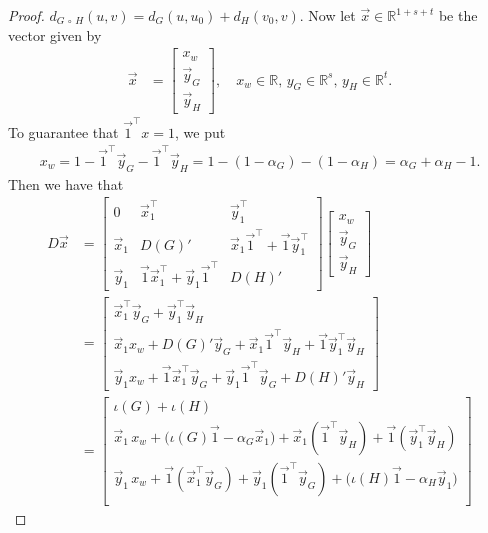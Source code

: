 \documentclass[11pt,a4paper]{article}
\newcommand{\distmatrix}{D}
\newcommand{\x}{\vec{x}}
\newcommand{\y}{\vec{y}}
\newcommand{\one}{\vec{1}}
\newcommand{\Circ}{\circ}
\begin{document}
\begin{proof}
        $d_{G\,\Circ\,H}(u, v)=d_G(u,u_{0})+d_H(v_{0},v)$. Now let $\x\in\mathbb{R}^{1+s+t}$ be the vector given by
            \begin{align}\label{eq:xw}
                \x &= \begin{bmatrix}
                    x_w\\ \y_G \\ \y_H
                \end{bmatrix}, \quad x_w\in\mathbb{R},\, y_G\in\mathbb{R}^{s},\,y_H\in\mathbb{R}^{t}.
            \end{align}
        To guarantee that $\one^\top x = 1$, we put
            \begin{align*}
                x_w = 1-\one^\top \y_G - \one^\top \y_H = 1 - (1-\alpha_G) - (1-\alpha_H) = \alpha_G + \alpha_H - 1.
            \end{align*}
        Then we have that
            \begin{align*}
                \distmatrix \x &= \begin{bmatrix}
                    0 & \x_{1}^\top & \y_{1}^\top\\
                    \x_{1} & {\distmatrix(G)}' & \x_{1}\one^\top + \one \y_{1}^\top\\
                    \y_{1} & \one \x_{1}^\top + \y_{1}\one^\top & {\distmatrix(H)}'
                \end{bmatrix}\begin{bmatrix}
                    x_w\\ \y_G \\ \y_H
                \end{bmatrix}\\
                &= \begin{bmatrix}
                    \x_{1}^\top \y_G + \y_{1}^\top \y_H\\
                    \x_{1} x_w + {\distmatrix(G)}' \y_G + \x_1\one^\top\y_H + \one \y_{1}^\top \y_H\\
                    \y_{1} x_w + \one \x_{1}^\top \y_G + \y_1\one^\top \y_G + {\distmatrix(H)}' \y_H
                \end{bmatrix}\\
                &= \begin{bmatrix}
                    \iota(G) + \iota(H)\\
                    \x_1\,x_w + \bigl(\iota(G)\one - \alpha_G\x_1\bigr) + \x_1(\one^\top\y_H) + \one(\y_1^\top\y_H)\\
                    \y_1\,x_w + \one(\x_1^\top\y_G) + \y_1(\one^\top\y_G) + \bigl(\iota(H)\one - \alpha_H\y_1\bigr)\\

\end{bmatrix}
\end{align*}
\end{proof}
\end{document}
